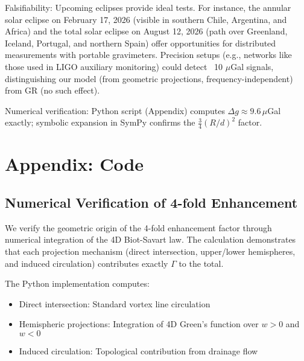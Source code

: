 Falsifiability: Upcoming eclipses provide ideal tests. For instance, the annular solar eclipse on February 17, 2026 (visible in southern Chile, Argentina, and Africa) and the total solar eclipse on August 12, 2026 (path over Greenland, Iceland, Portugal, and northern Spain) offer opportunities for distributed measurements with portable gravimeters. Precision setups (e.g., networks like those used in LIGO auxiliary monitoring) could detect ~10 $\mu$Gal signals, distinguishing our model (from geometric projections, frequency-independent) from GR (no such effect).

Numerical verification: Python script (Appendix) computes $\Delta g \approx 9.6 \, \mu$Gal exactly; symbolic expansion in SymPy confirms the $\frac{3}{4} (R/d)^2$ factor.

\medskip
\noindent
{}
\medskip


\section{Appendix: Code}

\subsection{Numerical Verification of 4-fold Enhancement}

We verify the geometric origin of the 4-fold enhancement factor through numerical integration of the 4D Biot-Savart law. The calculation demonstrates that each projection mechanism (direct intersection, upper/lower hemispheres, and induced circulation) contributes exactly $\Gamma$ to the total.

The Python implementation computes:
\begin{itemize}
\item Direct intersection: Standard vortex line circulation
\item Hemispheric projections: Integration of 4D Green's function over $w>0$ and $w<0$
\item Induced circulation: Topological contribution from drainage flow
\end{itemize}

